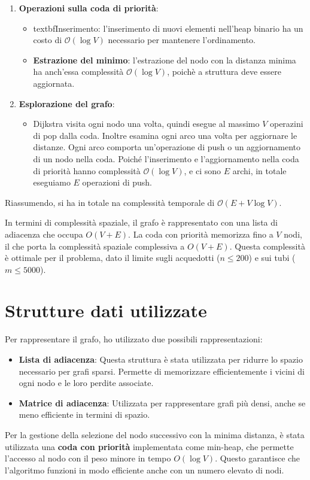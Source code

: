 \documentclass[a4paper,12pt]{article}
\begin{document}
\begin{enumerate}
    \item \textbf{Operazioni sulla coda di priorità}: 
    \begin{itemize}
        \item textbf{Inserimento}: l'inserimento di nuovi elementi nell'heap binario ha
        un costo di $\mathcal{O}(\log{V})$ necessario per mantenere l'ordinamento.
        \item \textbf{Estrazione del minimo}: l'estrazione del nodo con la distanza minima 
        ha anch'essa complessità $\mathcal{O}(\log{V})$, poichè a struttura deve essere aggiornata.
    \end{itemize}

    \item \textbf{Esplorazione del grafo}:
    \begin{itemize}
        \item Dijkstra visita ogni nodo una volta, quindi esegue al massimo $V$ operazini di pop
        dalla coda. Inoltre esamina ogni arco una volta per aggiornare le distanze.
        Ogni arco comporta un'operazione di push o un aggiornamento di un nodo nella coda. 
        Poiché l'inserimento e l'aggiornamento nella coda di priorità hanno complessità 
        $\mathcal{O}(\log{V})$, e ci sono $E$ archi, in totale eseguiamo $E$ operazioni 
        di push.
    \end{itemize}
\end{enumerate}

Riassumendo, si ha in totale na complessità temporale di $\mathcal{O}(E + V \log{V})$.

In termini di complessità spaziale, il grafo è rappresentato con una lista 
di adiacenza che occupa $O(V+E)$. La coda con priorità memorizza fino a $V$ nodi, 
il che porta la complessità spaziale complessiva a $O(V+E)$. 
Questa complessità è ottimale per il problema, dato il limite 
sugli acquedotti ($n \leq 200$) e sui tubi ($m \leq 5000$).

\section{Strutture dati utilizzate}
Per rappresentare il grafo, ho utilizzato due possibili rappresentazioni:
\begin{itemize}
    \item \textbf{Lista di adiacenza}: Questa struttura è stata utilizzata per ridurre lo spazio necessario per grafi sparsi. Permette di memorizzare efficientemente i vicini di ogni nodo e le loro perdite associate.
    \item \textbf{Matrice di adiacenza}: Utilizzata per rappresentare grafi più densi, anche se meno efficiente in termini di spazio.
\end{itemize}

Per la gestione della selezione del nodo successivo con la minima distanza, è stata 
utilizzata una \textbf{coda con priorità} implementata come min-heap, che permette 
l'accesso al nodo con il peso minore in tempo $O(\log V)$. Questo garantisce che 
l'algoritmo funzioni in modo efficiente anche con un numero elevato di nodi.
\end{document}
